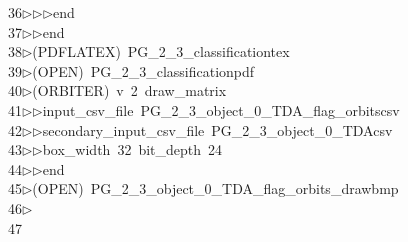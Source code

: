 \begin{tabbing}
36\>$\triangleright$\>$\triangleright$\>$\triangleright$\>end\ \\[0pt]
37\>$\triangleright$\>$\triangleright$\>end\\[0pt]
38\>$\triangleright$\>(PDFLATEX)\ PG\_2\_3\_classificationtex\\[0pt]
39\>$\triangleright$\>(OPEN)\ PG\_2\_3\_classificationpdf\\[0pt]
40\>$\triangleright$\>(ORBITER)\ v\ 2\ draw\_matrix\ \\[0pt]
41\>$\triangleright$\>$\triangleright$\>input\_csv\_file\ PG\_2\_3\_object\_0\_TDA\_flag\_orbitscsv\ \\[0pt]
42\>$\triangleright$\>$\triangleright$\>secondary\_input\_csv\_file\ PG\_2\_3\_object\_0\_TDAcsv\ \\[0pt]
43\>$\triangleright$\>$\triangleright$\>box\_width\ 32\ bit\_depth\ 24\ \\[0pt]
44\>$\triangleright$\>$\triangleright$\>end\\[0pt]
45\>$\triangleright$\>(OPEN)\ PG\_2\_3\_object\_0\_TDA\_flag\_orbits\_drawbmp\\[0pt]
46\>$\triangleright$\>\\[0pt]
47\>\end{tabbing}
